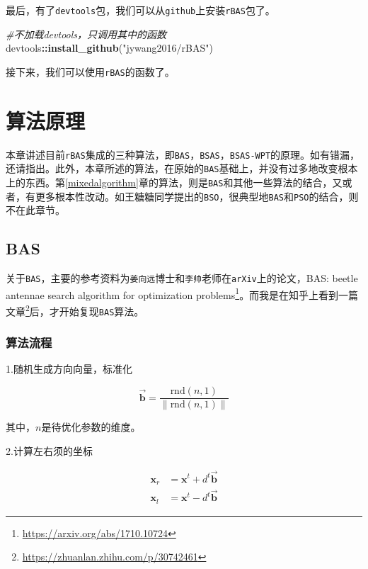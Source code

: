 \documentclass[]{ctexbook}
\newenvironment{Shaded}{\begin{snugshade}}{\end{snugshade}}
\newcommand{\KeywordTok}[1]{\textcolor[rgb]{0.13,0.29,0.53}{\textbf{#1}}}
\newcommand{\StringTok}[1]{\textcolor[rgb]{0.31,0.60,0.02}{#1}}
\newcommand{\CommentTok}[1]{\textcolor[rgb]{0.56,0.35,0.01}{\textit{#1}}}
\newcommand{\OperatorTok}[1]{\textcolor[rgb]{0.81,0.36,0.00}{\textbf{#1}}}
\newcommand{\NormalTok}[1]{#1}
\renewcommand{\href}[2]{#2\footnote{\url{#1}}}
\theoremstyle{definition}
\theoremstyle{definition}
\theoremstyle{definition}
\theoremstyle{remark}
\begin{document}
最后，有了\texttt{devtools}包，我们可以从\texttt{github}上安装\texttt{rBAS}包了。

\begin{Shaded}
\begin{Highlighting}[]
\CommentTok{#不加载devtools，只调用其中的函数}
\NormalTok{devtools}\OperatorTok{::}\KeywordTok{install_github}\NormalTok{(}\StringTok{"jywang2016/rBAS"}\NormalTok{)}
\end{Highlighting}
\end{Shaded}

接下来，我们可以使用\texttt{rBAS}的函数了。

\chapter{算法原理}\label{algorithm}

本章讲述目前\texttt{rBAS}集成的三种算法，即\texttt{BAS}，\texttt{BSAS}，\texttt{BSAS-WPT}的原理。如有错漏，还请指出。此外，本章所述的算法，在原始的\texttt{BAS}基础上，并没有过多地改变根本上的东西。第\ref{mixedalgorithm}章的算法，则是\texttt{BAS}和其他一些算法的结合，又或者，有更多根本性改动。如王糖糖同学提出的\texttt{BSO}，很典型地\texttt{BAS}和\texttt{PSO}的结合，则不在此章节。

\section{BAS}\label{bas}

关于\texttt{BAS}，主要的参考资料为\texttt{姜向远}博士和\texttt{李帅}老师在\texttt{arXiv}上的论文，\href{https://arxiv.org/abs/1710.10724}{BAS:
beetle antennae search algorithm for optimization
problems}。而我是在知乎上看到一篇\href{https://zhuanlan.zhihu.com/p/30742461}{文章}后，才开始复现\texttt{BAS}算法。

\subsection{算法流程}\label{BASflow}

1.随机生成方向向量，标准化

\begin{equation}
\overrightarrow{\mathbf{b}}=\frac{\text{rnd}(n,1)}{\|\text{rnd}(n,1)\|}
\label{eq:dir}
\end{equation}

其中，\(n\)是待优化参数的维度。

2.计算左右须的坐标

\begin{equation}
\begin{split}
\mathbf{x}_r&=\mathbf{x}^t+d^t\overrightarrow{\mathbf{b}} \\
\mathbf{x}_l&=\mathbf{x}^t-d^t\overrightarrow{\mathbf{b}}
\end{split}
\label{eq:xlxr}
\end{equation}
\end{document}
